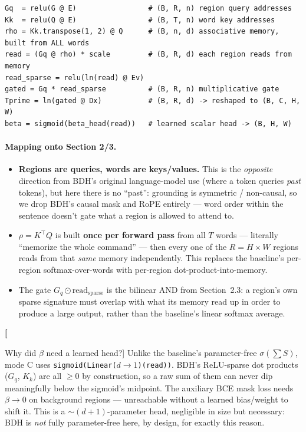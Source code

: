 \documentclass[11pt]{article}
\newlength{\boxinnerwidth}
\newenvironment{qabox}[1]{%
  \setlength{\boxinnerwidth}{\dimexpr\linewidth-2\fboxsep-2\fboxrule\relax}%
  \begin{lrbox}{\qaboxbin}
  \begin{minipage}{\boxinnerwidth}
  \noindent\textbf{#1}\par\smallskip
}{%
  \end{minipage}
  \end{lrbox}%
  \par\addvspace{8pt}\noindent\fcolorbox{orange!60!black}{yellow!6}{\usebox{\qaboxbin}}\par\addvspace{8pt}%
}
\begin{document}
\begin{lstlisting}[caption={Mode C forward pass (\texttt{bdh\_grounding/bdh\_fusion.py:\_forward\_C}), abbreviated}]
Gq  = relu(G @ E)                 # (B, R, n) region query addresses
Kk  = relu(Q @ E)                 # (B, T, n) word key addresses
rho = Kk.transpose(1, 2) @ Q      # (B, n, d) associative memory, built from ALL words
read = (Gq @ rho) * scale         # (B, R, d) each region reads from memory
read_sparse = relu(ln(read) @ Ev)
gated = Gq * read_sparse          # (B, R, n) multiplicative gate
Tprime = ln(gated @ Dx)           # (B, R, d) -> reshaped to (B, C, H, W)
beta = sigmoid(beta_head(read))   # learned scalar head -> (B, H, W)
\end{lstlisting}

\paragraph{Mapping onto Section 2/3.}
\begin{itemize}[leftmargin=1.4em]
  \item \textbf{Regions are queries, words are keys/values.} This is the
        \emph{opposite} direction from BDH's original language-model use (where a
        token queries \emph{past} tokens), but here there is no ``past'':
        grounding is symmetric / non-causal, so we drop BDH's causal mask and RoPE
        entirely --- word order within the sentence doesn't gate what a region is
        allowed to attend to.
  \item $\rho = K^{\top}Q$ is built \textbf{once per forward pass} from all $T$
        words --- literally ``memorize the whole command'' --- then every one of
        the $R = H{\times}W$ regions reads from that \emph{same} memory
        independently. This replaces the baseline's per-region softmax-over-words
        with per-region dot-product-into-memory.
  \item The gate $G_q \odot \text{read}_{\text{sparse}}$ is the bilinear AND from
        Section~2.3: a region's own sparse signature must overlap with what its
        memory read up in order to produce a large output, rather than the
        baseline's linear softmax average.
\end{itemize}

\begin{qabox}[Why did \texorpdfstring{$\beta$}{beta} need a learned head?]
Unlike the baseline's parameter-free $\sigma(\sum S)$, mode C uses
\texttt{sigmoid(Linear($d\to1$)(read))}. BDH's ReLU-sparse dot products
($G_q$, $K_k$) are all $\geq 0$ by construction, so a raw sum of them can never dip
meaningfully below the sigmoid's midpoint. The auxiliary BCE mask loss needs
$\beta \to 0$ on background regions --- unreachable without a learned bias/weight to
shift it. This is a $\sim(d{+}1)$-parameter head, negligible in size but necessary:
BDH is \emph{not} fully parameter-free here, by design, for exactly this reason.
\end{qabox}
\end{document}
